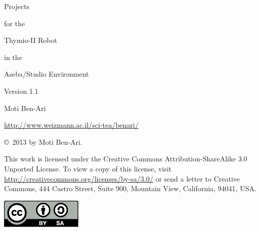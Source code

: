 \thispagestyle{empty}

\begin{center}
\begin{bfseries}
\begin{LARGE}
Projects 

for the 

Thymio-II Robot

in the 

Aseba/Studio Environment

\bigskip
\end{LARGE}

\begin{large}
Version 1.1
\end{large}

\begin{LARGE}
\bigskip\bigskip\bigskip\bigskip

Moti Ben-Ari

\bigskip
\end{LARGE}

\begin{large}
\url{http://www.weizmann.ac.il/sci-tea/benari/}
\end{large}
\end{bfseries}
\end{center}

\vfill

\begin{center}
\copyright{}\  2013 by Moti Ben-Ari. 
\end{center}

This work is licensed under the Creative Commons
Attribution-ShareAlike 3.0 Unported License. To view a copy
of this license, visit
\url{http://creativecommons.org/licenses/by-sa/3.0/}
or send a letter to Creative Commons, 444 Castro Street, Suite 900,
Mountain View, California, 94041, USA.

\begin{center}
\includegraphics[width=.2\textwidth]{../images/by-sa}
\end{center}

\tableofcontents
\thispagestyle{empty}
